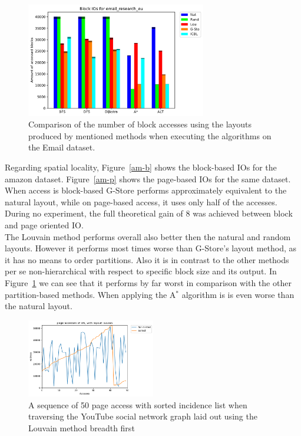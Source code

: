     \begin{figure}[htp]
        \begin{center}
            \includegraphics[keepaspectratio,width=0.7\textwidth]{img/07-eval/email_research_eu_Block_unsorted_io_comparison.pdf}
        \end{center}
        \caption{Comparison of the number of block accesses using the layouts produced by mentioned methods when executing the algorithms on the Email dataset.} 
        \label{email-block}
    \end{figure}
    
    Regarding spatial locality, Figure~\ref{am-b} shows the block-based IOs for the amazon dataset. Figure~\ref{am-p} shows the page-based IOs for the same dataset. When access is block-based G-Store performs approximately equivalent to the natural layout, while on page-based access, it uses only half of the accesses. During no experiment, the full theoretical gain of 8 was achieved between block and page oriented IO. \\
    
    The Louvain method performs overall also better then the natural and random layouts. However it performs most times worse than G-Store's layout method, as it has no means to order partitions. Also it is in contrast to the other methods per se non-hierarchical with respect to specific block size and its output. In Figure~\ref{email-block} we can see that it performs by far worst in comparison with the other partition-based methods. When applying the A$^*$ algorithm is is even worse than the natural layout.
    
      \begin{figure}[htp]
        \begin{center}
            \includegraphics[keepaspectratio,width=0.5\textwidth]{img/07-eval/youtube_louvain_bfs_page_sil_access_seq.png}
        \end{center}
        \caption{A sequence of 50 page access with sorted incidence list when traversing the YouTube social network graph laid out using the Louvain method breadth first} 
        \label{yt-sq}
    \end{figure}
    
